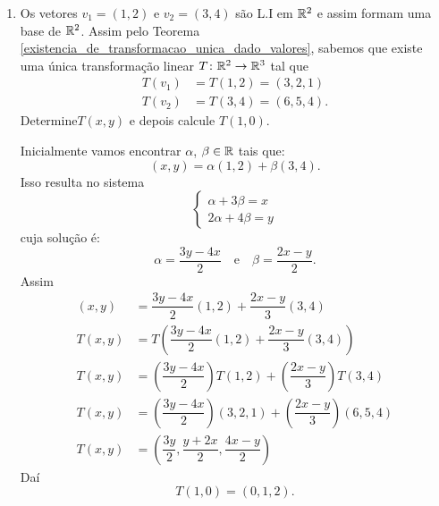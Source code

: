 \begin{exemplos}
\begin{enumerate}[label={\arabic*})]
        \item Os vetores $v_1 = (1,2)$ e $v_2 = (3,4)$ são L.I em $\mathbb{R}^2$ e assim formam uma base de $\mathbb{R}^2$. Assim pelo Teorema \ref{existencia_de_transformacao_unica_dado_valores}, sabemos que existe uma única transformação linear $T \colon \mathbb{R}^2 \to \mathbb{R}^3$ tal que
        \begin{align*}
            T(v_1) &= T(1,2) = (3,2,1)\\
            T(v_2) &= T(3,4) = (6,5,4).
        \end{align*}
        Determine$T(x, y)$ e depois calcule $T(1,0)$.
        \begin{solucao}
            Inicialmente vamos encontrar $\alpha$, $\beta \in \mathbb{R}$ tais que:
            \[
            (x, y) = \alpha(1,2) + \beta(3,4).
            \]
            Isso resulta no sistema
            \[
                \begin{cases}
                    \alpha + 3\beta = x\\
                    2\alpha + 4\beta = y
                \end{cases}
            \]
            cuja solução é:
            \[
                \alpha = \dfrac{3y - 4x}{2}\quad \mbox{e}\quad \beta = \dfrac{2x - y}{2}.
            \]
            Assim
            \begin{align*}
                (x, y) &= \dfrac{3y - 4x}{2}(1, 2) + \dfrac{2x - y}{3}(3, 4)\\
                T(x, y) &= T\left(\dfrac{3y - 4x}{2}(1, 2) + \dfrac{2x - y}{3}(3, 4)\right)\\
                T(x, y) &= \left(\dfrac{3y - 4x}{2}\right)T(1, 2) + \left(\dfrac{2x - y}{3}\right)T(3, 4)\\
                T(x, y) &= \left(\dfrac{3y - 4x}{2}\right)(3, 2, 1) + \left(\dfrac{2x - y}{3}\right)(6, 5, 4)\\
                T(x, y) &= \left(\dfrac{3y}{2}, \dfrac{y + 2x}{2}, \dfrac{4x - y}{2}\right)
            \end{align*}
            Daí
            \[
                T(1,0) =(0,1,2).
            \]
        \end{solucao}
    \end{enumerate}
\end{exemplos}


